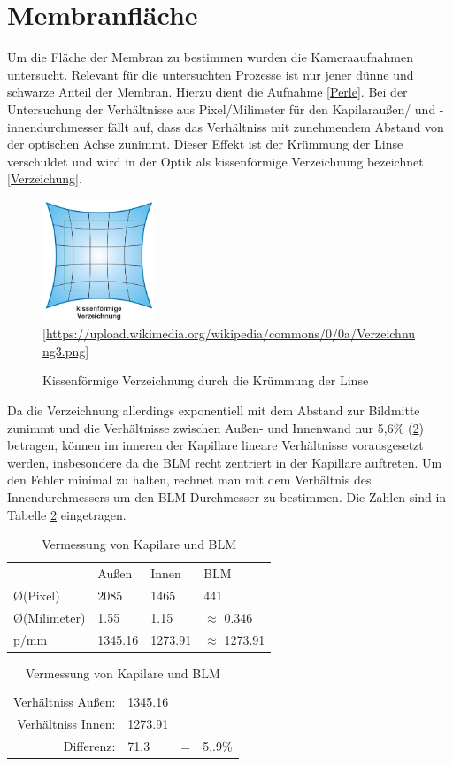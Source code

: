 \documentclass{include/thesisclass3}
\begin{document}
\section{Membranfläche}
Um die Fläche der Membran zu bestimmen wurden die Kameraaufnahmen untersucht. Relevant für die untersuchten Prozesse ist nur jener dünne und schwarze Anteil der Membran. Hierzu dient die Aufnahme \ref{Perle}. Bei der Untersuchung der Verhältnisse aus Pixel/Milimeter für den Kapilaraußen/ und -innendurchmesser fällt auf, dass das Verhältniss mit zunehmendem Abstand von der optischen Achse zunimmt. Dieser Effekt ist der Krümmung der Linse verschuldet und wird in der Optik als kissenförmige Verzeichnung bezeichnet \ref{Verzeichung}.
\begin{figure}[ht]
	\begin{center}
		\includegraphics[width=0.3\textwidth]{images/Verzeichnung.png}
		[\url{https://upload.wikimedia.org/wikipedia/commons/0/0a/Verzeichnung3.png}]
		\caption{Kissenförmige Verzeichnung durch die Krümmung der Linse}
		\label{Verzeichnung}
	\end{center}
\end{figure}
Da die Verzeichnung allerdings exponentiell mit dem Abstand zur Bildmitte zunimmt und die Verhältnisse zwischen Außen- und Innenwand nur 5,6\% (\ref{tab-ratio}) betragen, können im inneren der Kapillare lineare Verhältnisse vorausgesetzt werden, insbesondere da die BLM recht zentriert in der Kapillare auftreten.
Um den Fehler minimal zu halten, rechnet man mit dem Verhältnis des Innendurchmessers um den BLM-Durchmesser zu bestimmen. Die Zahlen sind in Tabelle \ref{tab-ratio} eingetragen.

\begin{table}[H]
	\centering
	\begin{tabular}{llll}
		& Au\ss en   & Innen     & BLM     \\
		\O  (Pixel) & 2085    & 1465    & 441     \\
		\O  (Milimeter)       & 1.55    & 1.15    & $\approx$ 0.346   \\
		p/mm            & 1345.16 & 1273.91 & $\approx$ 1273.91
	\end{tabular}
	\begin{tabular}{rll}
Verhältniss Außen: & 1345.16 & \\
Verhältniss Innen: & 1273.91 & \\
Differenz: & 71.3 & =~~5,.9\%\\
\end{tabular}
	\caption{Vermessung von Kapilare und BLM}
	\label{tab-ratio}
\end{table}
\end{document}
